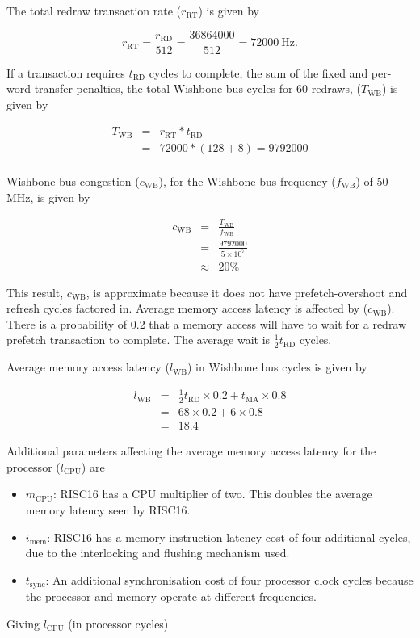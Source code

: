 The total redraw transaction rate ($r_\mathrm{RT}$) is given by

\[
r_\mathrm{RT} = \frac{r_\mathrm{RD}}{512} = \frac{36864000}{512} =
72000~\mathrm{Hz}.
\]

If a transaction requires $t_\mathrm{RD}$ cycles to complete, the sum of the
fixed and per-word transfer penalties, the total Wishbone bus cycles for 60
redraws, ($T_\mathrm{WB}$) is given by

\begin{eqnarray*}
T_\mathrm{WB} & = & r_\mathrm{RT} * t_\mathrm{RD} \\
  & = & 72000 * (128 + 8) = 9792000 \\
\end{eqnarray*}

Wishbone bus congestion ($c_\mathrm{WB}$), for the Wishbone bus frequency
($f_\mathrm{WB}$) of 50 MHz, is given by

\begin{eqnarray*}
c_\mathrm{WB} & = & \frac{T_\mathrm{WB}}{f_\mathrm{WB}} \\
 & = & \frac{9792000}{5\times10^7} \\
 & \approx & 20\%
\end{eqnarray*}

This result, $c_\mathrm{WB}$, is approximate because it does not have
prefetch-overshoot and refresh cycles factored in. Average memory access latency
is affected by ($c_\mathrm{WB}$). There is a probability of 0.2 that a memory
access will have to wait for a redraw prefetch transaction to complete. The
average wait is $\frac{1}{2}t_\mathrm{RD}$ cycles.

Average memory access latency ($l_\mathrm{WB}$) in Wishbone bus cycles is given
by

\begin{eqnarray*}
l_\mathrm{WB}	& = & \frac{1}{2}t_\mathrm{RD}\times 0.2 + t_\mathrm{MA} \times
0.8 \\
& = & 68 \times 0.2 + 6 \times 0.8 \\
& = & 18.4
\end{eqnarray*}

Additional parameters affecting the average memory access latency for the
processor ($l_\mathrm{CPU}$) are
\begin{itemize}
  \item $m_\mathrm{CPU}$: RISC16 has a CPU multiplier of two. This doubles
  the average memory latency seen by RISC16.
  \item $i_\mathrm{mem}$: RISC16 has a memory instruction latency cost of four
  additional cycles, due to the interlocking and flushing mechanism used.
  \item $t_\mathrm{sync}$: An additional synchronisation cost of four
  processor clock cycles because the processor and memory operate at different
  frequencies.
\end{itemize}
Giving $l_\mathrm{CPU}$ (in processor cycles)

